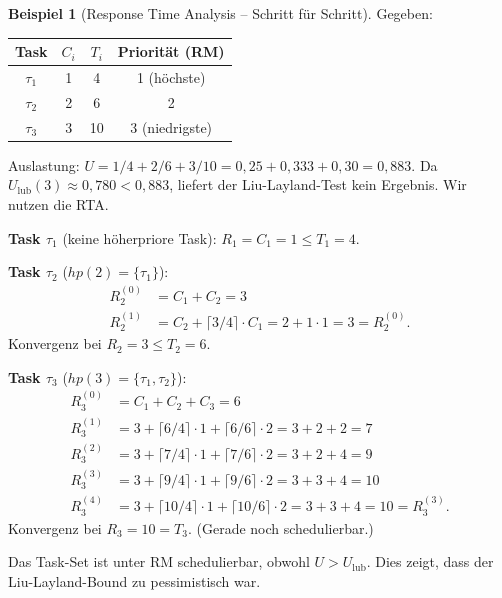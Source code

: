 ﻿\documentclass[a4paper,12pt]{report}
\theoremstyle{definition}
\newtheorem{beispiel}{Beispiel}[chapter]
\begin{document}
\begin{beispiel}[Response Time Analysis -- Schritt für Schritt]
	Gegeben:
	\begin{center}
		\begin{tabular}{cccc}
			\toprule
			Task    & $C_i$ & $T_i$ & Priorität (RM) \\
			\midrule
			$\tau_1$ & 1     & 4     & 1 (höchste) \\
			$\tau_2$ & 2     & 6     & 2 \\
			$\tau_3$ & 3     & 10    & 3 (niedrigste) \\
			\bottomrule
		\end{tabular}
	\end{center}

	Auslastung: $U = 1/4 + 2/6 + 3/10 = 0{,}25 + 0{,}333 + 0{,}30 = 0{,}883$.
	Da $U_{\text{lub}}(3) \approx 0{,}780 < 0{,}883$, liefert der Liu-Layland-Test
	kein Ergebnis. Wir nutzen die RTA.

	\textbf{Task $\tau_1$} (keine höherpriore Task):
	$R_1 = C_1 = 1 \leq T_1 = 4$. \checkmark

	\textbf{Task $\tau_2$} ($hp(2) = \{\tau_1\}$):
	\begin{align*}
		R_2^{(0)} &= C_1 + C_2 = 3 \\
		R_2^{(1)} &= C_2 + \lceil 3/4 \rceil \cdot C_1 = 2 + 1 \cdot 1 = 3 = R_2^{(0)}.
	\end{align*}
	Konvergenz bei $R_2 = 3 \leq T_2 = 6$. \checkmark

	\textbf{Task $\tau_3$} ($hp(3) = \{\tau_1, \tau_2\}$):
	\begin{align*}
		R_3^{(0)} &= C_1 + C_2 + C_3 = 6 \\
		R_3^{(1)} &= 3 + \lceil 6/4 \rceil \cdot 1 + \lceil 6/6 \rceil \cdot 2 = 3 + 2 + 2 = 7 \\
		R_3^{(2)} &= 3 + \lceil 7/4 \rceil \cdot 1 + \lceil 7/6 \rceil \cdot 2 = 3 + 2 + 4 = 9 \\
		R_3^{(3)} &= 3 + \lceil 9/4 \rceil \cdot 1 + \lceil 9/6 \rceil \cdot 2 = 3 + 3 + 4 = 10 \\
		R_3^{(4)} &= 3 + \lceil 10/4 \rceil \cdot 1 + \lceil 10/6 \rceil \cdot 2 = 3 + 3 + 4 = 10 = R_3^{(3)}.
	\end{align*}
	Konvergenz bei $R_3 = 10 = T_3$. \checkmark (Gerade noch schedulierbar.)

	Das Task-Set ist unter RM schedulierbar, obwohl $U > U_{\text{lub}}$.
	Dies zeigt, dass der Liu-Layland-Bound zu pessimistisch war.
\end{beispiel}
\end{document}
